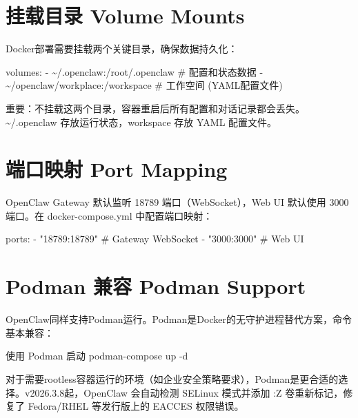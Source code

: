\documentclass[
  10
]{article}
\newenvironment{Shaded}{}{}
\newcommand{\NormalTok}[1]{#1}
\begin{document}
\section{挂载目录 Volume
Mounts}\label{ux6302ux8f7dux76eeux5f55-volume-mounts}

Docker部署需要挂载两个关键目录，确保数据持久化：

\begin{Shaded}
\begin{Highlighting}[]
\NormalTok{volumes:  }
\NormalTok{{-} \textasciitilde{}/.openclaw:/root/.openclaw \# 配置和状态数据  }
\NormalTok{{-} \textasciitilde{}/openclaw/workplace:/workspace \# 工作空间 (YAML配置文件)}
\end{Highlighting}
\end{Shaded}

重要：不挂载这两个目录，容器重启后所有配置和对话记录都会丢失。
\textasciitilde/.openclaw 存放运行状态，workspace 存放 YAML 配置文件。

\section{端口映射 Port
Mapping}\label{ux7aefux53e3ux6620ux5c04-port-mapping}

OpenClaw Gateway 默认监听 18789 端口（WebSocket），Web UI 默认使用 3000
端口。在 docker-compose.yml 中配置端口映射：

\begin{Shaded}
\begin{Highlighting}[]
\NormalTok{ports: {-} "18789:18789" \# Gateway WebSocket {-} "3000:3000" \# Web UI}
\end{Highlighting}
\end{Shaded}

\section{Podman 兼容 Podman
Support}\label{podman-ux517cux5bb9-podman-support}

OpenClaw同样支持Podman运行。Podman是Docker的无守护进程替代方案，命令基本兼容：

\begin{Shaded}
\begin{Highlighting}[]
\NormalTok{使用 Podman 启动 podman{-}compose up {-}d}
\end{Highlighting}
\end{Shaded}

对于需要rootless容器运行的环境（如企业安全策略要求），Podman是更合适的选择。v2026.3.8起，OpenClaw
会自动检测 SELinux 模式并添加 :Z 卷重新标记，修复了 Fedora/RHEL
等发行版上的 EACCES 权限错误。
\end{document}
